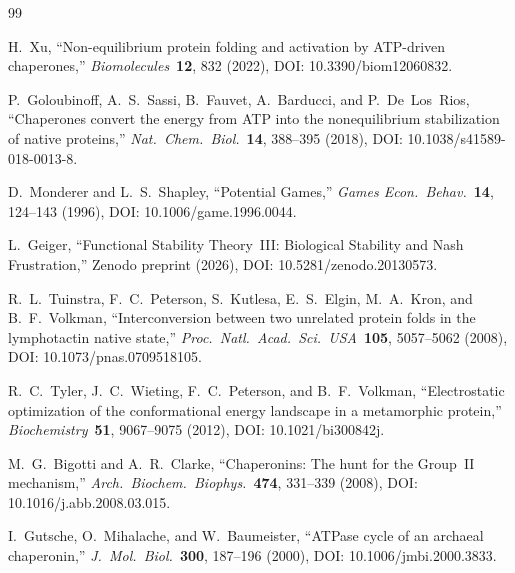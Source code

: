 \documentclass[12pt,a4paper]{article}
\begin{document}
\begin{thebibliography}{99}

H.~Xu,
``Non-equilibrium protein folding and activation by ATP-driven
chaperones,''
\textit{Biomolecules}\ \textbf{12}, 832 (2022), DOI: 10.3390/biom12060832.

P.~Goloubinoff, A.~S.~Sassi, B.~Fauvet, A.~Barducci, and P.~De~Los~Rios,
``Chaperones convert the energy from ATP into the nonequilibrium
stabilization of native proteins,''
\textit{Nat.\ Chem.\ Biol.}\ \textbf{14}, 388--395 (2018), DOI: 10.1038/s41589-018-0013-8.

D.~Monderer and L.~S.~Shapley,
``Potential Games,''
\textit{Games Econ.\ Behav.}\ \textbf{14}, 124--143 (1996), DOI: 10.1006/game.1996.0044.

L.~Geiger,
``Functional Stability Theory~III: Biological Stability and Nash
Frustration,''
Zenodo preprint (2026), DOI: 10.5281/zenodo.20130573.

R.~L.~Tuinstra, F.~C.~Peterson, S.~Kutlesa, E.~S.~Elgin,
M.~A.~Kron, and B.~F.~Volkman,
``Interconversion between two unrelated protein folds in the
lymphotactin native state,''
\textit{Proc.\ Natl.\ Acad.\ Sci.\ USA}\ \textbf{105}, 5057--5062 (2008), DOI: 10.1073/pnas.0709518105.

R.~C.~Tyler, J.~C.~Wieting, F.~C.~Peterson, and B.~F.~Volkman,
``Electrostatic optimization of the conformational energy landscape in
a metamorphic protein,''
\textit{Biochemistry}\ \textbf{51}, 9067--9075 (2012), DOI: 10.1021/bi300842j.

M.~G.~Bigotti and A.~R.~Clarke,
``Chaperonins: The hunt for the Group~II mechanism,''
\textit{Arch.\ Biochem.\ Biophys.}\ \textbf{474}, 331--339 (2008), DOI: 10.1016/j.abb.2008.03.015.

I.~Gutsche, O.~Mihalache, and W.~Baumeister,
``ATPase cycle of an archaeal chaperonin,''
\textit{J.\ Mol.\ Biol.}\ \textbf{300}, 187--196 (2000), DOI: 10.1006/jmbi.2000.3833.

\end{thebibliography}
\end{document}
